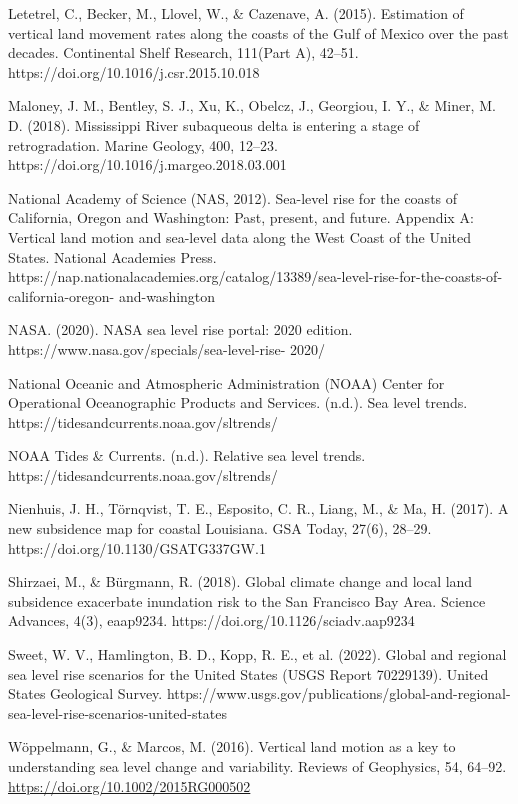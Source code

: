 \documentclass[12pt,paper=a4,DIV=12,parskip=never,chapterprefix=false,headings=standardclasses]{scrreprt}
\begin{document}
Letetrel, C., Becker, M., Llovel, W., \& Cazenave, A. (2015). Estimation of vertical land movement rates
along the coasts of the Gulf of Mexico over the past decades. Continental Shelf Research, 111(Part
A), 42–51. https://doi.org/10.1016/j.csr.2015.10.018

Maloney, J. M., Bentley, S. J., Xu, K., Obelcz, J., Georgiou, I. Y., \& Miner, M. D. (2018). Mississippi
River subaqueous delta is entering a stage of retrogradation. Marine Geology, 400, 12–23.
https://doi.org/10.1016/j.margeo.2018.03.001

National Academy of Science (NAS, 2012). Sea-level rise for the coasts of California, Oregon and
Washington: Past, present, and future. Appendix A: Vertical land motion and sea-level data along the
West Coast of the United States. National Academies Press.
https://nap.nationalacademies.org/catalog/13389/sea-level-rise-for-the-coasts-of-california-oregon-
and-washington

NASA. (2020). NASA sea level rise portal: 2020 edition. https://www.nasa.gov/specials/sea-level-rise-
2020/

National Oceanic and Atmospheric Administration (NOAA) Center for Operational Oceanographic
Products and Services. (n.d.). Sea level trends. https://tidesandcurrents.noaa.gov/sltrends/

NOAA Tides \& Currents. (n.d.). Relative sea level trends. https://tidesandcurrents.noaa.gov/sltrends/

Nienhuis, J. H., Törnqvist, T. E., Esposito, C. R., Liang, M., \& Ma, H. (2017). A new subsidence map for
coastal Louisiana. GSA Today, 27(6), 28–29. https://doi.org/10.1130/GSATG337GW.1

Shirzaei, M., \& Bürgmann, R. (2018). Global climate change and local land subsidence exacerbate
inundation risk to the San Francisco Bay Area. Science Advances, 4(3), eaap9234.
https://doi.org/10.1126/sciadv.aap9234

Sweet, W. V., Hamlington, B. D., Kopp, R. E., et al. (2022). Global and regional sea level rise scenarios
for the United States (USGS Report 70229139). United States Geological Survey.
https://www.usgs.gov/publications/global-and-regional-sea-level-rise-scenarios-united-states

Wöppelmann, G., \& Marcos, M. (2016). Vertical land motion as a key to understanding sea level change
and variability. Reviews of Geophysics, 54, 64–92. \url{https://doi.org/10.1002/2015RG000502}

\endgroup
\end{document}
